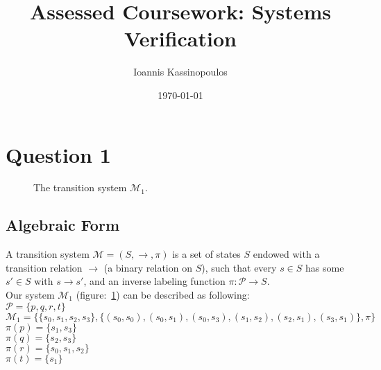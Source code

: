 \documentclass[a4paper,10pt]{article}
\begin{document}
\title{Assessed Coursework: Systems Verification}
\author{Ioannis Kassinopoulos}
\date{\today}
\maketitle
\section*{Question 1}
\begin{figure}[H]
  \centering
  \caption{The transition system $\mathcal{M}_1$.}
  \label{fig:m1}
\end{figure}

\subsection*{Algebraic Form}

A transition system $\mathcal{M}=(S,\rightarrow,\pi)$ is a set of states $S$ endowed with a transition relation 
$\rightarrow$ (a binary relation on $S$), such that every $s \in  S$ has some $s'\in S$ with $s\rightarrow s'$,
and an inverse labeling function $\pi:\mathcal{P}\rightarrow S$.
\\[0.5cm] 
Our system $\mathcal{M}_1$ (figure:~\ref{fig:m1}) can be described as following:
\\[0.cm] 
$\mathcal{P} = \{p,q,r,t\}$
\\[0.10cm] 
$\mathcal{M}_1 = \{\{ s_0,s_1,s_2,s_3 \} , \{ (s_0,s_0),(s_0,s_1),(s_0,s_3),(s_1,s_2),(s_2,s_1),(s_3,s_1)   \} , \pi \}$
\\[0.10cm] 
$\pi(p) = \{s_1,s_3 \}$
\\[0.10cm] 
$\pi(q) = \{s_2,s_3 \}$
\\[0.10cm] 
$\pi(r) = \{s_0,s_1,s_2 \}$
\\[0.10cm] 
$\pi(t) = \{ s_1 \}$
\end{document}

